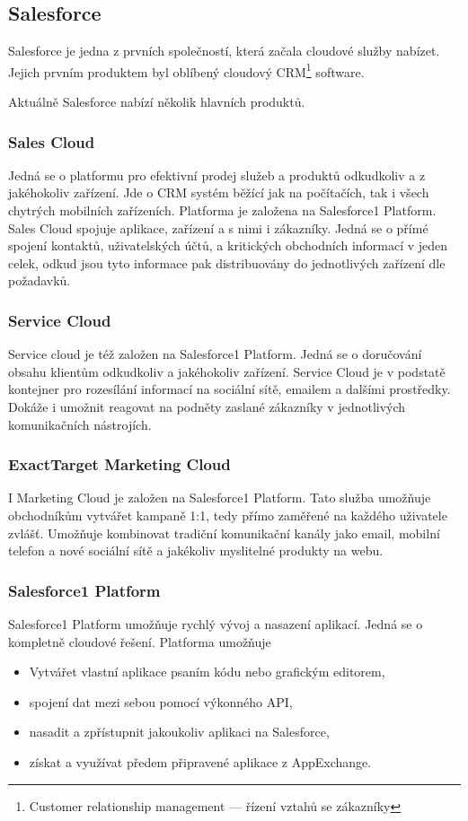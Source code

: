 \subsection{Salesforce}
Salesforce je jedna z prvních společností, která začala cloudové služby nabízet. Jejich prvním produktem byl oblíbený cloudový CRM\footnote{Customer relationship management --- řízení vztahů se zákazníky} software.

Aktuálně Salesforce nabízí několik hlavních produktů.

\subsubsection{Sales Cloud}
Jedná se o platformu pro efektivní prodej služeb a produktů odkudkoliv a z jakéhokoliv zařízení. Jde o CRM systém běžící jak na počítačích, tak i všech chytrých mobilních zařízeních. Platforma je založena na Salesforce1 Platform. Sales Cloud spojuje aplikace, zařízení a s nimi i zákazníky. Jedná se o přímé spojení kontaktů, uživatelských účtů, a kritických obchodních informací v jeden celek, odkud jsou tyto informace pak distribuovány do jednotlivých zařízení dle požadavků.\nocite{salesforce:salesCloud}

\subsubsection{Service Cloud}
Service cloud je též založen na Salesforce1 Platform. Jedná se o doručování obsahu klientům odkudkoliv a jakéhokoliv zařízení. Service Cloud je v podstatě kontejner pro rozesílání informací na sociální sítě, emailem a dalšími prostředky. Dokáže i umožnit reagovat na podněty zaslané zákazníky v jednotlivých komunikačních nástrojích.\nocite{salesforce:serviceCloud}

\subsubsection{ExactTarget Marketing Cloud}
I Marketing Cloud je založen na Salesforce1 Platform. Tato služba umožňuje obchodníkům vytvářet kampaně 1:1, tedy přímo zaměřené na každého uživatele zvlášť. Umožňuje kombinovat tradiční komunikační kanály jako email, mobilní telefon a nové sociální sítě a jakékoliv myslitelné produkty na webu.\nocite{salesforce:marketingCloud}

\subsubsection{Salesforce1 Platform}
Salesforce1 Platform umožňuje rychlý vývoj a nasazení aplikací. Jedná se o kompletně cloudové řešení.\nocite{salesforce:platform} Platforma umožňuje
	\begin{itemize}
		\item Vytvářet vlastní aplikace psaním kódu nebo grafickým editorem,
		\item spojení dat mezi sebou pomocí výkonného API,
		\item nasadit a zpřístupnit jakoukoliv aplikaci na Salesforce,
		\item získat a využívat předem připravené aplikace z AppExchange.
	\end{itemize}

